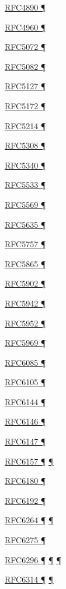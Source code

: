 \documentclass[
]{article}
\begin{document}
\hyperref[filtering]{RFC4890 ¶}

\hyperref[transport-protocols]{RFC4960 ¶}

\hyperref[layer-2-functions]{RFC5072 ¶}

\hyperref[filtering]{RFC5082 ¶}

\hyperref[traffic-class-and-flow-label]{RFC5127 ¶}

\hyperref[layer-2-functions]{RFC5172 ¶}

\hyperref[obsolete-techniques]{RFC5214 ¶}

\hyperref[routing]{RFC5308 ¶}

\hyperref[routing]{RFC5340 ¶}

\hyperref[multihoming]{RFC5533 ¶}

\hyperref[obsolete-techniques]{RFC5569 ¶}

\hyperref[filtering]{RFC5635 ¶}

\hyperref[address-resolution]{RFC5757 ¶}

\hyperref[traffic-class-and-flow-label]{RFC5865 ¶}

\hyperref[translation-and-ipv4-as-a-service]{RFC5902 ¶}

\hyperref[auto-configuration]{RFC5942 ¶}

\hyperref[addresses]{RFC5952 ¶}

\hyperref[tunnels]{RFC5969 ¶}

\hyperref[layer-2-functions]{RFC6085 ¶}

\hyperref[layer-2-considerations]{RFC6105 ¶}

\hyperref[translation-and-ipv4-as-a-service]{RFC6144 ¶}

\hyperref[translation-and-ipv4-as-a-service]{RFC6146 ¶}

\hyperref[translation-and-ipv4-as-a-service]{RFC6147 ¶}

\hyperref[dual-stack-scenarios]{RFC6157 ¶} \hyperref[multihoming]{¶}

\hyperref[coexistence-with-legacy-ipv4]{RFC6180 ¶}

\hyperref[filtering]{RFC6192 ¶}

\hyperref[obsolete-techniques]{RFC6264 ¶} \hyperref[tunnels]{¶}

\hyperref[obsolete-features-in-ipv6]{RFC6275 ¶}

\hyperref[translation-and-ipv4-as-a-service]{RFC6296 ¶}
\hyperref[security]{¶} \hyperref[multihoming]{¶}

\hyperref[translation-and-ipv4-as-a-service]{RFC6314 ¶}
\hyperref[multihoming]{¶}
\end{document}
